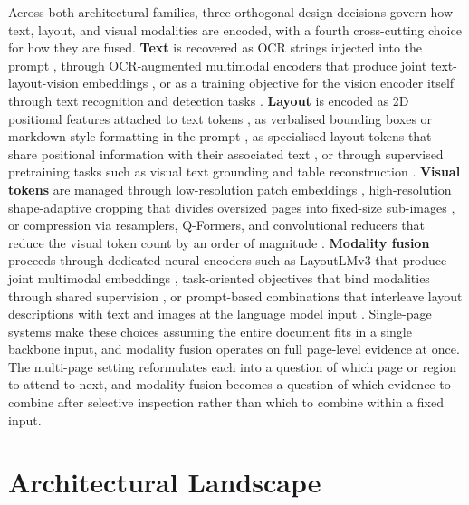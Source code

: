 \documentclass[11pt]{article}
\begin{document}
Across both architectural families, three orthogonal design decisions govern how text, layout, and visual modalities are encoded, with a fourth cross-cutting choice for how they are fused. \textbf{Text} is recovered as OCR strings injected into the prompt \cite{wang2024docllm,kim2024dockd}, through OCR-augmented multimodal encoders that produce joint text-layout-vision embeddings \cite{luo2024layoutllm,zhu2025enhancing}, or as a training objective for the vision encoder itself through text recognition and detection tasks \cite{wang2023towards,feng2023unidoc,wang2025marten}. \textbf{Layout} is encoded as 2D positional features attached to text tokens \cite{xu2020layoutlm,zhu2025enhancing}, as verbalised bounding boxes or markdown-style formatting in the prompt \cite{he2023icld3ie,lamott2024lapdoc,perot2024lmdx}, as specialised layout tokens that share positional information with their associated text \cite{zhu2025simple}, or through supervised pretraining tasks such as visual text grounding and table reconstruction \cite{liu2024hrvda,liu2024textmonkey,liao2024doclayllm}. \textbf{Visual tokens} are managed through low-resolution patch embeddings \cite{xie2024pdfwukong,tanaka2024instructdoc}, high-resolution shape-adaptive cropping that divides oversized pages into fixed-size sub-images \cite{ye2023ureader,hu2024mplugdocowl}, or compression via resamplers, Q-Formers, and convolutional reducers that reduce the visual token count by an order of magnitude \cite{hu2025mplugdocowl2,yu2024texthawk2,liu2024textmonkey}. \textbf{Modality fusion} proceeds through dedicated neural encoders such as LayoutLMv3 that produce joint multimodal embeddings \cite{huang2022layoutlmv3,luo2024layoutllm}, task-oriented objectives that bind modalities through shared supervision \cite{hu2024mplugdocowl,wang2025marten}, or prompt-based combinations that interleave layout descriptions with text and images at the language model input \cite{lamott2024lapdoc,perot2024lmdx,luo2024layoutllm}. Single-page systems make these choices assuming the entire document fits in a single backbone input, and modality fusion operates on full page-level evidence at once. The multi-page setting reformulates each into a question of which page or region to attend to next, and modality fusion becomes a question of which evidence to combine after selective inspection rather than which to combine within a fixed input.

\section{Architectural Landscape}
\label{sec:architecture}
\end{document}
